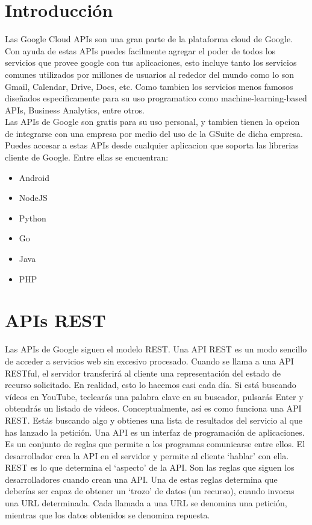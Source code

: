 \documentclass[titlepage]{article} %
\begin{document}

\tableofcontents
\clearpage

\section{Introducción}
Las Google Cloud APIs son una gran parte de la plataforma cloud de Google.
Con ayuda de estas APIs puedes facilmente agregar el poder de todos 
los servicios que provee google con tus aplicaciones, esto incluye 
tanto los servicios comunes utilizados por millones de usuarios al 
rededor del mundo como lo son Gmail, Calendar, Drive, Docs, etc. Como
tambien los servicios menos famosos diseñados especificamente para su 
uso programatico como machine-learning-based APIs, Business Analytics,
entre otros. \\
Las APIs de Google son gratis para su uso personal, y tambien tienen 
la opcion de integrarse con una empresa por medio del uso de la GSuite 
de dicha empresa. \\
Puedes accesar a estas APIs desde cualquier aplicacion que soporta 
las librerias cliente de Google. Entre ellas se encuentran:
\begin{itemize}
  \item Android
  \item NodeJS
  \item Python
  \item Go
  \item Java
  \item PHP
\end{itemize}
\section {APIs REST}
Las APIs de Google siguen el modelo REST. 
Una API REST es un modo sencillo de acceder a servicios web sin excesivo procesado. Cuando se llama a una API RESTful, el servidor transferirá al cliente una representación del estado de recurso solicitado.
En realidad, esto lo hacemos casi cada día. Si está buscando vídeos en YouTube, teclearás una palabra clave en su buscador, pulsarás Enter y obtendrás un listado de vídeos. Conceptualmente, así es como funciona una API REST. Estás buscando algo y obtienes una lista de resultados del servicio al que has lanzado la petición.
Una API es un interfaz de programación de aplicaciones. Es un conjunto de reglas que permite a los programas comunicarse entre ellos. El desarrollador crea la API en el servidor y permite al cliente ‘hablar’ con ella.
REST es lo que determina el ‘aspecto’ de la API. Son las reglas que siguen los desarrolladores cuando crean una API. Una de estas reglas determina que deberías ser capaz de obtener un ‘trozo’ de datos (un recurso), cuando invocas una URL determinada.
Cada llamada a una URL se denomina una petición, mientras que los datos obtenidos se denomina repuesta.
\end{document}
